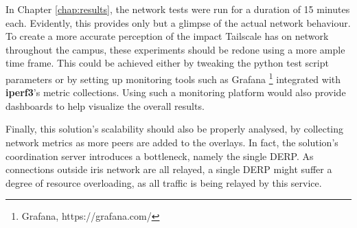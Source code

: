 \documentclass[11pt,twoside,a4paper]{report}
\begin{document}
In Chapter \ref{chap:results}, the network tests were run for a duration of 15 minutes each. Evidently, this provides only but a glimpse of the actual network behaviour. To create a more accurate perception of the impact Tailscale has on network throughout the campus, these experiments should be redone using a more ample time frame. This could be achieved either by tweaking the python test script parameters or by setting up monitoring tools such as Grafana \footnote{Grafana, https://grafana.com/} integrated with \textbf{iperf3}'s metric collections. Using such a monitoring platform would also provide dashboards to help visualize the overall results.

Finally, this solution's scalability should also be properly analysed, by collecting network metrics as more peers are added to the overlays. In fact, the solution's coordination server introduces a bottleneck, namely  the single \ac{DERP}. As connections outside \ac{iris} network are all relayed, a single \ac{DERP} might suffer a degree of resource overloading, as all traffic is being relayed by this service.

%
%
\cleardoublepage



\cleardoublepage
\end{document}
